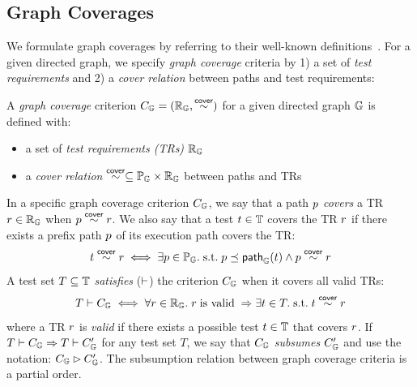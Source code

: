 

\subsection{Graph Coverages}\label{sec:cov}

We formulate graph coverages by referring to their well-known
definitions~\cite{testing}.
%
For a given directed graph, we specify \textit{graph coverage} criteria by 1) a
set of \textit{test requirements} and 2) a \textit{cover relation} between paths
and test requirements:


\begin{definition}\label{def:graph-cov}
  A \textit{graph coverage} criterion $C_{\mathbb{G}} = (\mathbb{R}_{\mathbb{G}}, \overset{\textsf{cover}}{\sim})$
  for a given directed graph $\mathbb{G}$ is defined with:
  \begin{itemize}
    \item a set of \textit{test requirements (TRs)} $\mathbb{R}_{\mathbb{G}}$
    \item a \textit{cover relation} $\overset{\textsf{cover}}{\sim} \subseteq \mathbb{P}_{\mathbb{G}} \times
      \mathbb{R}_{\mathbb{G}}$ between paths and TRs
  \end{itemize}
\end{definition}


In a specific graph coverage criterion $C_{\mathbb{G}}$, we say that a path $p$
\textit{covers} a TR $r \in \mathbb{R}_{\mathbb{G}}$ when $p \overset{\textsf{cover}}{\sim}
r$.
%
We also say that a test $t \in \mathbb{T}$ covers the TR $r$ if there exists
a prefix path $p$ of its execution path covers the TR:
%
\begin{equation}\label{equ:test-cover}
  t \overset{\textsf{cover}}{\sim} r
  \iff
  \exists p \in \mathbb{P}_{\mathbb{G}}. {\; \text{s.t.} \; }
  p \preceq \textsf{path}_{\mathbb{G}}(t) \wedge
  p \overset{\textsf{cover}}{\sim} r
\end{equation}
%
A test set $T \subseteq \mathbb{T}$ \textit{satisfies} ($\vdash$) the criterion
$C_{\mathbb{G}}$ when it covers all valid TRs:
\begin{equation}\label{equ:sat}
  T \vdash C_{\mathbb{G}}
  \iff
  \forall r \in \mathbb{R}_{\mathbb{G}}. \;
  r \; \text{is valid} \; \Rightarrow
  \exists t \in T. {\; \text{s.t.} \; } t \overset{\textsf{cover}}{\sim} r
\end{equation}
where a TR $r$ is \textit{valid} if there exists a possible test $t \in
\mathbb{T}$ that covers $r$.
%
If $T \vdash C_{\mathbb{G}} \Rightarrow T \vdash C_{\mathbb{G}}'$ for any test set $T$,
we say that $C_{\mathbb{G}}$ \textit{subsumes} $C_{\mathbb{G}}'$ and use the
notation: $C_{\mathbb{G}} \rhd C_{\mathbb{G}}'$.
%
The subsumption relation between graph coverage criteria is a partial order.

